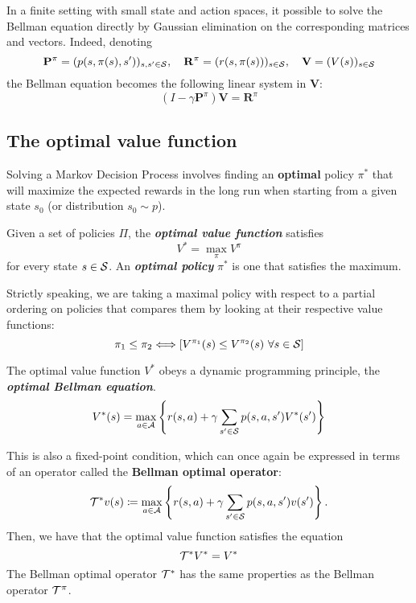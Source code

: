 \documentclass[../course-notes.tex]{subfiles}
\begin{document}
In a finite setting with small state and action spaces, it possible to solve the Bellman equation directly by Gaussian elimination on the corresponding matrices and vectors.
Indeed, denoting
\[
	\mathbf{P}^\pi =(p(s,\pi(s),s'))_{s,s'\in\mathcal{S}},\quad
	\mathbf{R}^\pi = (r(s,\pi(s)))_{s\in\mathcal{S}},
	\quad
	\mathbf{V} = (V(s))_{s\in\mathcal{S}}
\]
the Bellman equation becomes the following linear system in $\mathbf{V}$:
\begin{equation}\label{eq:BellmanEqnMatrixVector}
	(I - \gamma\mathbf{P}^\pi)\mathbf{V} =
	\mathbf{R}^\pi
\end{equation}


\subsection{The optimal value function}\label{sec:OptimalValueFunc}

Solving a Markov Decision Process involves finding an \textbf{\bluefont optimal} policy $\pi^*$ that will maximize the expected rewards in the long run when starting from a given state $s_0$ (or distribution $s_0 \sim p$).

\begin{defn}
	Given a set of policies $\Pi$, the \emph{\bfseries\bluefont optimal value function} satisfies
	\begin{equation}
	V^* = \max_{\pi} V^{\pi}
	\end{equation}
	for every state $s \in \mathcal{S}$. An \emph{\bfseries\bluefont optimal policy} $\pi^*$ is one that satisfies the maximum.
\end{defn}

Strictly speaking, we are taking a maximal policy with respect to a partial ordering on policies that compares them by looking at their respective value functions:
\[
	\pi_1 \leq \pi_2 \Longleftrightarrow
	\left[
	V^{\pi_1}(s) \leq V^{\pi_2}(s)\ \forall s\in\mathcal{S}
	\right]
\]


\begin{prop}
	The optimal value function $V^*$ obeys a dynamic programming principle, the \emph{\bfseries\bluefont optimal Bellman equation}.
	\begin{equation}\label{eq:ValueOptimalBellmanEq}
	V^*(s) = \max_{a\in\mathcal{A}}
	\left\{
	r(s,a) + \gamma \sum_{s'\in\mathcal{S}} p(s,a,s')V^*(s')
	\right\}
	\end{equation}
\end{prop}


This is also a fixed-point condition, which can once again be expressed in terms of an operator called the \textbf{Bellman optimal operator}:
\[
\mathcal{T}^*v(s) \coloneqq
\max_{a\in\mathcal{A}} \left\{
r(s,a) + \gamma\sum_{s'\in\mathcal{S}}p(s,a,s')v(s')
\right\}.
\]
Then, we have that the optimal value function satisfies the equation
\[
\mathcal{T}^* V^* = V^*
\]
The Bellman optimal operator $\mathcal{T}^*$ has the same properties as the Bellman operator $\mathcal{T}^\pi$.
\end{document}

